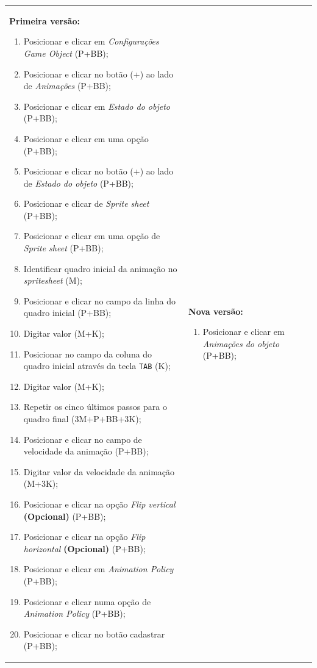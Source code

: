 \documentclass[12pt,oneside,openright,a4paper,english,brazil,sumario=tradicional]{abntex2}
\begin{document}
{\tiny
\noindent
\begin{tabularx}{\textwidth}{X X}
   \textbf{Primeira versão:}
   \begin{enumerate}
      \item Posicionar e clicar em \textit{Configurações Game Object} (P+BB);
      \item Posicionar e clicar no botão (+) ao lado de \textit{Animações} (P+BB);
      \item Posicionar e clicar em \textit{Estado do objeto} (P+BB);
      \item Posicionar e clicar em uma opção (P+BB);
      \item Posicionar e clicar no botão (+) ao lado de \textit{Estado do objeto} (P+BB);
      \item Posicionar e clicar de \emph{Sprite sheet} (P+BB);
      \item Posicionar e clicar em uma opção de \textit{Sprite sheet} (P+BB);
      \item Identificar quadro inicial da animação no \emph{spritesheet} (M);
      \item Posicionar e clicar no campo da linha do quadro inicial (P+BB);
      \item Digitar valor (M+K);
      \item Posicionar no campo da coluna do quadro inicial através da tecla \texttt{TAB} (K);
      \item Digitar valor (M+K);
      \item Repetir os cinco últimos passos para o quadro final (3M+P+BB+3K);
      \item Posicionar e clicar no campo de velocidade da animação (P+BB);
      \item Digitar valor da velocidade da animação (M+3K);
      \item Posicionar e clicar na opção \emph{Flip vertical} \textbf{(Opcional)} (P+BB);
      \item Posicionar e clicar na opção \emph{Flip horizontal} \textbf{(Opcional)} (P+BB);
      \item Posicionar e clicar em \emph{Animation Policy} (P+BB);
      \item Posicionar e clicar numa opção de \emph{Animation Policy} (P+BB);
      \item Posicionar e clicar no botão cadastrar (P+BB);
   \end{enumerate}
   &
   \textbf{Nova versão:}
   \begin{enumerate}
      \item Posicionar e clicar em \emph{Animações do objeto} (P+BB);

\end{enumerate}
\end{tabularx}}
\end{document}
